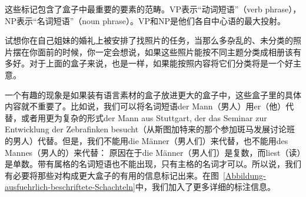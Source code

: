 这些标记包含了盒子中最重要的要素的范畴。VP表示“动词短语”（verb phrase），NP表示“名词短语”（noun phrase）。VP和NP是他们各自中心语的最大投射。

试想你在自己姐妹的婚礼上被安排了找照片的任务，当那么多杂乱的、未分类的照片摆在你面前的时候，你一定会想说，如果这些照片能按不同主题分类成相册该有多好。对于上面的盒子来说，也是一样，如果能按照内容将它们分类将是一个好主意。

一个有趣的现象是如果装有语言素材的盒子放进更大的盒子中，这些盒子里的具体内容就不重要了。比如说，我们可以将名词短语der Mann（男人）用er（他）代替，或者用更为复杂的形式der Mann aus Stuttgart, der das Seminar zur Entwicklung der Zebrafinken besucht（从斯图加特来的那个参加斑马发展讨论班的男人）代替。但是，我们不能用die Männer（男人们）来代替，也不能用des Mannes（男人的）来代替：
\eal 
{} 
\zl 
原因在于die Männer（男人们）是复数，而liest（读）是单数。带有属格的名词短语也不能出现，只有主格的名词才可以。所以说，我们有必要将那些对构成更大盒子的有用的信息标记出来。在图~\vref{Abbildung-ausfuehrlich-beschriftete-Schachteln}中，我们加入了更多详细的标注信息。

